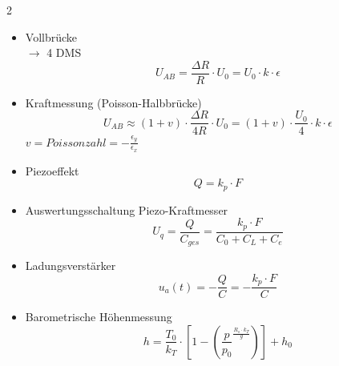 \begin{multicols*}{2}
\begin{itemize}
	\item Vollbrücke\\
	$\rightarrow$ 4 DMS
	\[U_{AB} = \frac{\Delta R}{R} \cdot U_0 = U_0 \cdot k \cdot \epsilon\]
	
	\vspace{1cm}
	
	\item Kraftmessung (Poisson-Halbbrücke)
	\[ U_{AB} \approx (1 + v) \cdot \frac{\Delta R}{4R}\cdot U_0 = (1 + v) \cdot \frac{U_0}{4}\cdot k \cdot \epsilon \]
	$v = Poissonzahl = -\frac{\epsilon_y}{\epsilon_x}$
	
	\vspace{1cm}
	
	\item Piezoeffekt
	\[ Q = k_p \cdot F\]
	
	\vspace{1cm}
	
	\item Auswertungsschaltung Piezo-Kraftmesser
	\[ U_q = \frac{Q}{C_{ges}} = \frac{k_p \cdot F}{C_0 + C_L + C_e}\]
	
	\vspace{1cm}
	
	\item Ladungsverstärker
	\[u_a(t) = -\frac{Q}{C} = - \frac{k_p \cdot F}{C}\]
	
	\vspace{1cm}
	
	\item Barometrische Höhenmessung
	\[ h = \frac{T_0}{k_T}\cdot \left[ 1 - \left( \frac{p}{p_0}^{\frac{R_s \cdot k_T}{g}} \right) \right] + h_0\]
\end{itemize}

\end{multicols*}
